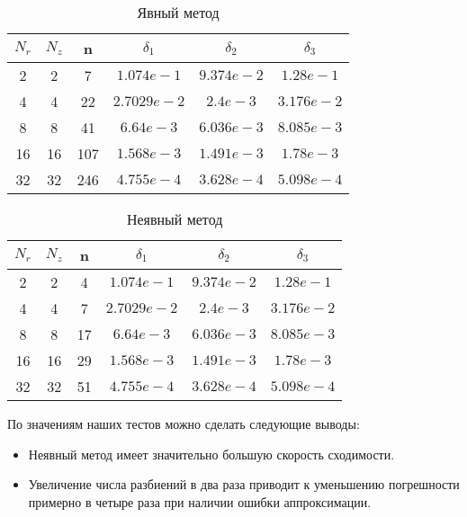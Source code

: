 \begin{table}[H]
  \begin{center}
    \begin{tabular}{*{6}c}
      \toprule
      $ N_r $ & $ N_z $ & n & $ \delta_1 $ & $ \delta_2 $ & $ \delta_3 $ \\
      \midrule
      2 & 2 & 7 & $1.074e-1 $ & $9.374e-2 $ & $1.28e-1 $ \\
      4 & 4 & 22 & $2.7029e-2 $ & $2.4e-3 $ & $3.176e-2 $ \\
      8 & 8 & 41 & $6.64e-3 $ & $6.036e-3 $ & $8.085e-3 $ \\
      16 & 16 & 107 & $1.568e-3 $ & $1.491e-3 $ & $1.78e-3 $ \\
      32 & 32 & 246 & $4.755e-4 $ & $3.628e-4 $ & $5.098e-4 $ \\
      \bottomrule
    \end{tabular}
    \caption{Явный метод}
  \end{center}
\end{table}
  
\begin{table}[H]
  \begin{center}
    \begin{tabular}{*{6}c}
      \toprule
      $ N_r $ & $ N_z $ & n & $ \delta_1 $ & $ \delta_2 $ & $ \delta_3 $ \\
      \midrule
      2 & 2 & 4 & $1.074e-1 $ & $9.374e-2 $ & $1.28e-1 $ \\
      4 & 4 & 7 & $2.7029e-2 $ & $2.4e-3 $ & $3.176e-2 $ \\
      8 & 8 & 17 & $6.64e-3 $ & $6.036e-3 $ & $8.085e-3 $ \\
      16 & 16 & 29 & $1.568e-3 $ & $1.491e-3 $ & $1.78e-3 $ \\
      32 & 32 & 51 & $4.755e-4 $ & $3.628e-4 $ & $5.098e-4 $ \\
      \bottomrule
    \end{tabular}
    \caption{Неявный метод}
  \end{center}
\end{table}

По значениям наших тестов можно сделать следующие выводы:
\begin{itemize}
  \item Неявный метод имеет значительно большую скорость сходимости.
  \item Увеличение числа разбиений в два раза приводит к уменьшению погрешности примерно в четыре раза при наличии ошибки аппроксимации.
\end{itemize}